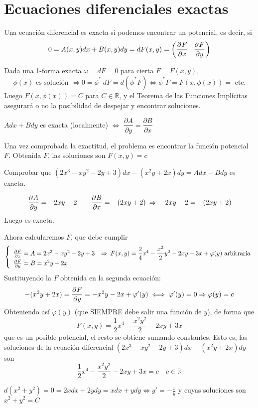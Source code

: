\section{Ecuaciones diferenciales exactas}
\begin{defi}
    Una ecuación diferencial es exacta si podemos encontrar un potencial, es decir, si
    $$0=A(x,y)dx+B(x,y)dy=dF(x,y)=\left(\frac{\partial^{} F}{\partial x} \; \; \; \frac{\partial^{} F}{\partial y}\right) $$
\end{defi}
\begin{defi}
    Dada una 1-forma exacta $\omega=dF=0$ para cierta $F=F(x,y)$, 
    $$\phi(x) \text{ es solución } \iff 0=\bar{\phi}^* \: dF = d(\bar{\phi}^* F) \iff \bar{\phi}^* F=F(x,\phi(x)) = \text{ cte.}$$
    Luego $F(x,\phi(x))=C$ para $C \in \mathbb{R}$, y el Teorema de las Funciones Implícitas asegurará o no la posibilidad de despejar y encontrar soluciones.
\end{defi}
\begin{prop} \: 
    \begin{center}
        $Adx+Bdy$ es exacta (localmente) $\iff$ $\dfrac{\partial A}{\partial y}=\dfrac{\partial B}{\partial x}$
    \end{center}
    
    Una vez comprobada la exactitud, el problema es encontrar la función potencial $F$. Obtenida $F$, las soluciones son $F(x,y)=c$
\end{prop}
\begin{ejer}
    Comprobar que $(2x^3-xy^2-2y+3)dx-(x^2y+2x)dy=Adx-Bdy$ es exacta.
\end{ejer}
\begin{sol}
    $$\frac{\partial^{} A}{\partial y}=-2xy-2 \qquad \frac{\partial^{} B}{\partial x}=-(2xy+2) \: \Rightarrow \: -2xy-2=-(2xy+2) $$
    Luego es exacta. 

    Ahora calcularemos $F$, que debe cumplir
    $$\left\{ \begin{array}{ll}
         \frac{\partial^{} F}{\partial x}=A= 2x^3-xy^2-2y+3 & \Rightarrow \: F(x,y)= \dfrac{2}{4}x^4 - \dfrac{x^2}{2}y^2 -2xy + 3x + \varphi(y) \text{  arbitraria}\\
         \frac{\partial^{} F}{\partial y}=B =x^2y+2x &
    \end{array}\right.$$
    Sustituyendo la $F$ obtenida en la segunda ecuación:
    $$ - (x^2y+2x)=\frac{\partial^{} F}{\partial y}=-x^2y-2x+\varphi'(y) \iff \varphi'(y)=0 \Rightarrow \varphi(y)=c$$
    Obteniendo así $\varphi(y)$ (que SIEMPRE debe salir una función de $y$), de forma que $$F(x,y)=\dfrac{1}{2}x^4-\dfrac{x^2y^2}{2}-2xy+3x$$
    que es un posible potencial, el resto se obtiene sumando constantes. Esto es, las soluciones de la ecuación diferencial $(2x^3-xy^2-2y+3)dx-(x^2y+2x)dy$ son
    $$\dfrac{1}{2}x^4-\dfrac{x^2y^2}{2}-2xy+3x=c \quad c \in \mathbb R$$
\end{sol}
\begin{eje}
    $d(x^2+y^2)=0=2xdx+2ydy=xdx+ydy\iff y'=-\frac{x}{y}$ y cuyas soluciones son $x^2+y^2=C$
\end{eje}
